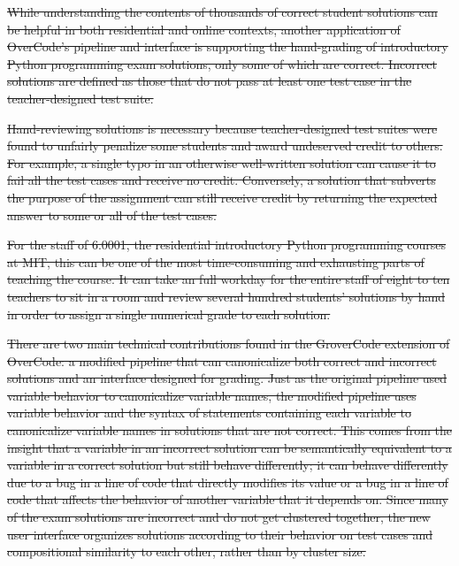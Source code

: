 \documentclass[12pt,twoside]{mitthesis}
\providecommand{\DIFdeltex}[1]{{\protect\color{red}\sout{#1}}}                      %
\providecommand{\DIFdel}[1]{\texorpdfstring{\DIFdeltex{#1}}{}} %
\begin{document}
{{{{{{{{{{%

\DIFdel{While understanding the contents of thousands of correct student solutions can be helpful in both residential and online contexts, another application of OverCode's pipeline and interface is supporting the hand-grading of introductory Python programming exam solutions, only some of which are correct. Incorrect solutions are defined as those that do not pass at least one test case in the teacher-designed test suite.
}%

\DIFdel{Hand-reviewing solutions is necessary because teacher-designed test suites were found to unfairly penalize some students and award undeserved credit to others. For example, a single typo in an otherwise well-written solution can cause it to fail all the test cases and receive no credit. Conversely, a solution that subverts the purpose of the assignment can still receive credit by returning the expected answer to some or all of the test cases.
}%

\DIFdel{For the staff of 6.0001, the residential introductory Python programming courses at MIT, this can be one of the most time-consuming and exhausting parts of teaching the course. It can take an full workday for the entire staff of eight to ten teachers to sit in a room and review several hundred students' solutions by hand in order to assign a single numerical grade to each solution. 
}%

\DIFdel{There are two main technical contributions found in the GroverCode extension of OverCode: a modified pipeline that can canonicalize both correct and incorrect solutions and an interface designed for grading. Just as the original pipeline used variable behavior to canonicalize variable names, the modified pipeline uses variable behavior and the syntax of statements containing each variable to canonicalize variable names in solutions that are not correct. This comes from the insight that a variable in an incorrect solution can be semantically equivalent to a variable in a correct solution but still behave differently; it can behave differently due to a bug in a line of code that directly modifies its value or a bug in a line of code that affects the behavior of another variable that it depends on. Since many of the exam solutions are incorrect and do not get clustered together, the new user interface organizes solutions according to their behavior on test cases and compositional similarity to each other, rather than by cluster size.
}%

}}}}}}}}}}
\end{document}
